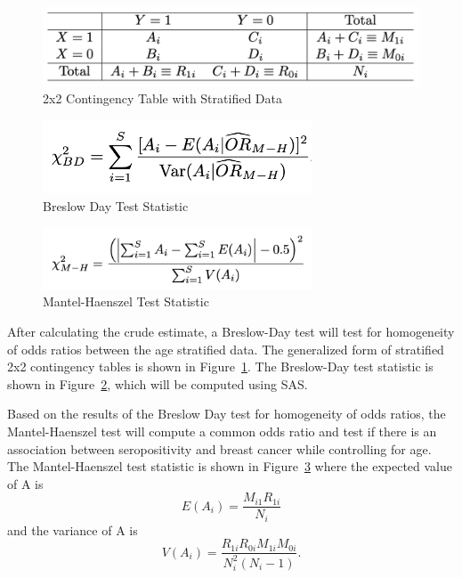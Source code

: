 \documentclass[12pt, titlepage]{article}
\begin{document}
\begin{figure}[tbp]
  \centering
  \includegraphics[width=12cm]{2x2 stratified table.png}
  \caption{2x2 Contingency Table with Stratified Data}
  \label{fig:strat}
\end{figure}

\begin{figure}[tbp]
  \centering
  \includegraphics[width=8cm]{breslow day test stat.png}
  \caption{Breslow Day Test Statistic}
  \label{fig:BD}
\end{figure}

\begin{figure}[tbp]
  \centering
  \includegraphics[width=8cm]{MH Test Stat.png}
  \caption{Mantel-Haenszel Test Statistic}
  \label{fig:MH}
\end{figure}


After calculating the crude estimate, a Breslow-Day test will test for 
homogeneity of odds ratios between the age stratified data. The generalized
form of stratified 2x2 contingency tables is shown in Figure~\ref{fig:strat}.
The Breslow-Day test statistic is shown in Figure~\ref{fig:BD}, which will
be computed using SAS.

Based on the results of the Breslow Day test for homogeneity of odds ratios,
the Mantel-Haenszel test will compute a common odds ratio and test if there 
is an association between seropositivity and breast cancer while controlling 
for age. The Mantel-Haenszel test statistic is shown in Figure~\ref{fig:MH}
where the expected value of A is 
\begin{equation}
  E(A_{i})=\frac{M_{i1}R_{1i}}{N_{i}} 
\end{equation}
and the variance of A is 
\begin{equation}
  V(A_{i})=\frac{R_{1i}R_{0i}M_{1i}M_{0i}}{N_i^2(N_{i}-1)}. 
\end{equation}
\end{document}
